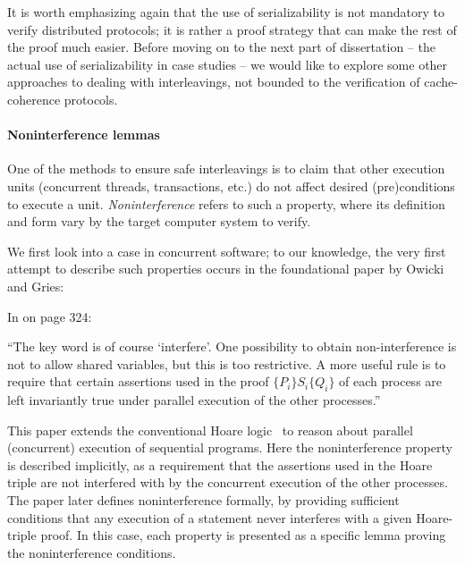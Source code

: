 It is worth emphasizing again that the use of serializability is not mandatory to verify distributed protocols; it is rather a proof strategy that can make the rest of the proof much easier.
Before moving on to the next part of dissertation -- the actual use of serializability in case studies -- we would like to explore some other approaches to dealing with interleavings, not bounded to the verification of cache-coherence protocols.

\paragraph{Noninterference lemmas}

One of the methods to ensure safe interleavings is to claim that other execution units (concurrent threads, transactions, etc.) do not affect desired (pre)conditions to execute a unit.
\emph{Noninterference} refers to such a property, where its definition and form vary by the target computer system to verify.

We first look into a case in concurrent software; to our knowledge, the very first attempt to describe such properties occurs in the foundational paper by Owicki and Gries:
\begin{displayquote}
  In \cite{Owicki:1976} on page 324:

  ``The key word is of course `interfere'.
  One possibility to obtain non-interference is not to allow shared variables, but this is too restrictive.
  A more useful rule is to require that certain assertions used in the proof $\{P_i\} S_i \{Q_i\}$ of each process are left invariantly true under parallel execution of the other processes.''
\end{displayquote}
This paper extends the conventional Hoare logic~\cite{Hoare} to reason about parallel (concurrent) execution of sequential programs.
Here the noninterference property is described implicitly, as a requirement that the assertions used in the Hoare triple are not interfered with by the concurrent execution of the other processes.
The paper later defines noninterference formally, by providing sufficient conditions that any execution of a statement never interferes with a given Hoare-triple proof.
In this case, each property is presented as a specific lemma proving the noninterference conditions.

